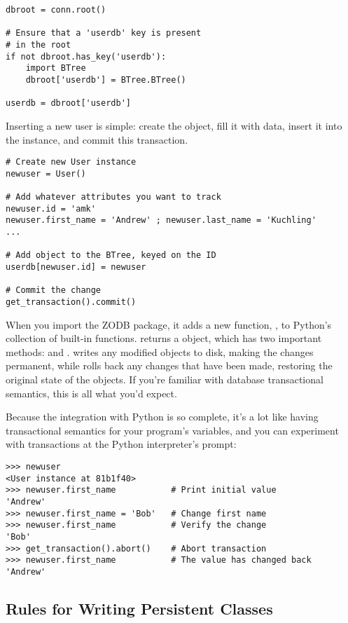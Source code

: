 \begin{verbatim}
dbroot = conn.root()

# Ensure that a 'userdb' key is present 
# in the root
if not dbroot.has_key('userdb'):
    import BTree
    dbroot['userdb'] = BTree.BTree()

userdb = dbroot['userdb']
\end{verbatim}

Inserting a new user is simple: create the  object, fill
it with data, insert it into the  instance, and commit
this transaction.

\begin{verbatim}# Create new User instance
newuser = User() 

# Add whatever attributes you want to track
newuser.id = 'amk' 
newuser.first_name = 'Andrew' ; newuser.last_name = 'Kuchling'
...

# Add object to the BTree, keyed on the ID
userdb[newuser.id] = newuser

# Commit the change
get_transaction().commit()
\end{verbatim}

When you import the ZODB package, it adds a new function,
, to Python's collection of built-in
functions.   returns a 
object, which has two important methods:  and
.   writes any modified objects
to disk, making the changes permanent, while  rolls
back any changes that have been made, restoring the original state of
the objects.  If you're familiar with database transactional
semantics, this is all what you'd expect.

Because the integration with Python is so complete, it's a lot like
having transactional semantics for your program's variables, and you
can experiment with transactions at the Python interpreter's prompt:

\begin{verbatim}>>> newuser
<User instance at 81b1f40>
>>> newuser.first_name           # Print initial value
'Andrew'         
>>> newuser.first_name = 'Bob'   # Change first name
>>> newuser.first_name           # Verify the change
'Bob'
>>> get_transaction().abort()    # Abort transaction
>>> newuser.first_name           # The value has changed back
'Andrew'
\end{verbatim}

\subsection{Rules for Writing Persistent Classes}

